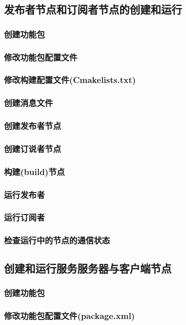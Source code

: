 \documentclass[geye,green,kindle,cn]{elegantnote}
\begin{document}
\subsection{发布者节点和订阅者节点的创建和运行}
\subsubsection{创建功能包}
\subsubsection{修改功能包配置文件}
\subsubsection{修改构建配置文件(Cmakelists.txt)}
\subsubsection{创建消息文件}
\subsubsection{创建发布者节点}
\subsubsection{创建订说者节点}
\subsubsection{构建(build)节点}
\subsubsection{运行发布者}
\subsubsection{运行订阅者}
\subsubsection{检查运行中的节点的通信状态}
\subsection{创建和运行服务服务器与客户端节点}
\subsubsection{创建功能包}
\subsubsection{修改功能包配置文件(package.xml)}
\end{document}
